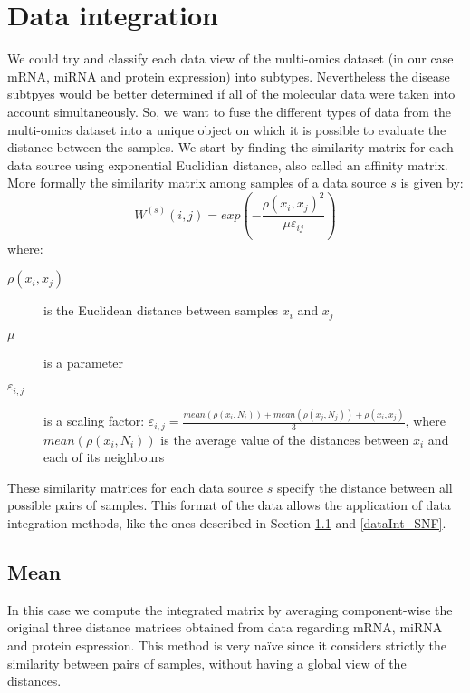 \section{Data integration}\label{introduction_dataInt}
We could try and classify each data view of the multi-omics dataset (in our case mRNA, miRNA and protein expression) into subtypes. Nevertheless the disease subtpyes would be better determined if all of the molecular data were taken into account simultaneously. So, we want to fuse the different types of data from the multi-omics dataset into a unique object on which it is possible to evaluate the distance between the samples. We start by finding the similarity matrix for each data source using exponential Euclidian distance, also called an affinity matrix.
More formally the similarity matrix among samples of a data source $s$ is given by:
\begin{equation} \label{eq:scaled_exponential_sim}
    W^{(s)}(i,j) = exp \left(- \frac{\rho(x_i,x_j)^2}{\mu \varepsilon_{ij}}\right)
\end{equation}
where:
\begin{description}
    \item [$\rho(x_i, x_j)$] is the Euclidean  distance  between samples \(x_i\) and \(x_j\)
    \item [$\mu$] is a parameter
    \item [$\varepsilon_{i,j}$] is a scaling factor: $\varepsilon_{i,j} = \frac{mean(\rho(x_i, N_i)) + mean(\rho(x_j, N_j)) + \rho(x_i, x_j)}{3}$, where  $mean(\rho(x_i, N_i))$ is the average value of the distances between $x_i$ and each of its neighbours
\end{description}
These similarity matrices for each data source $s$ specify the distance between all possible pairs of samples. This format of the data allows the application of data integration methods, like the ones described in Section \ref{dataInt_mean} and \ref{dataInt_SNF}.

\subsection{Mean} \label{dataInt_mean}
In this case we compute the integrated matrix by averaging component-wise the original three distance matrices obtained from data regarding mRNA, miRNA and protein espression. This method is very naïve since it considers strictly the similarity between pairs of samples, without having a global view of the distances.

